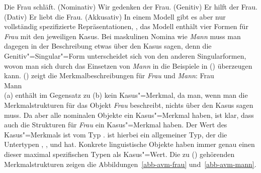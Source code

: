 \eal\jamwidth=6cm\relax
\ex Die Frau schläft.       \jam(Nominativ)
\ex Wir gedenken der Frau.  \jam(Genitiv)
\ex Er hilft der Frau.      \jam(Dativ)
\ex Er liebt die Frau.      \jam(Akkusativ)
\zl
In einem Modell gibt es aber nur vollständig spezifizierte Repräsentationen,
\dash, das Modell enthält vier Formen für \emph{Frau} mit den jeweiligen Kasus.
Bei maskulinen Nomina wie \emph{Mann} muss man dagegen in der Beschreibung
etwas über den Kasus sagen, denn die Genitiv"=Singular"=Form unterscheidet
sich von den anderen Singularformen, wovon man sich durch das Einsetzen
von \emph{Mann} in die Beispiele in () überzeugen kann. () zeigt die
Merkmalbeschreibungen für \emph{Frau} und \emph{Mann}:
\eal
\ex\label{avm-frau}
Frau\\
\ex\label{avm-mann}
Mann\\
\zl
(a) enthält im Gegensatz zu (b) kein Kasus"=Merkmal, da man, wenn man die
Merkmalstrukturen für das Objekt \emph{Frau} beschreibt, nichts über den Kasus sagen muss. Da aber
alle nominalen Objekte ein Kasus"=Merkmal haben, ist klar, dass auch die Strukturen für \emph{Frau}
ein Kasus"=Merkmal haben. Der Wert des Kasus"=Merkmals ist vom Typ .
 ist hierbei ein allgemeiner Typ, der die Untertypen , ,
 und  hat. Konkrete linguistische Objekte haben immer genau einen dieser
maximal spezifischen Typen als Kasus"=Wert. Die zu () gehörenden Merkmalstrukturen zeigen die
Abbildungen~\ref{abb-avm-frau} und~\ref{abb-avm-mann}.%
